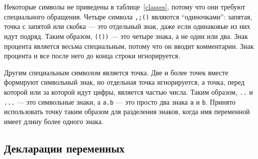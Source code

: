 \documentclass{article} %
\begin{document}
Некоторые символы не приведены в таблице~\ref{classes}, потому что они 
требуют специального обращения.
Четыре символа {\tt ,;()} являются ``одиночками'': запятая, точка с запятой или 
скобка --- это отдельный знак, даже если одинаковые из них идут подряд.
Таким образом, {\tt (())} --- это четыре знака, а не один или два.
Знак процента является весьма специальным, потому что он вводит 
комментарии. 
Знак процента и все после него до конца строки игнорируется.

Другим специальным символом является точка.
Две и более точек вместе формируют символьный знак, но отдельная точка 
игнорируется, а точка, перед которой или за которой идут цифры, является 
частью числа.
Таким образом, {\tt ..} и {\tt ...} --- это символьные знаки, а {\tt a.b} --- это 
просто два знака {\tt a} и {\tt b}. 
Принято использовать точку таким образом для разделения знаков, когда имя  
переменной имеет длину более одного знака.

\subsection{Декларации переменных}
\label{vardecl}
\end{document}
